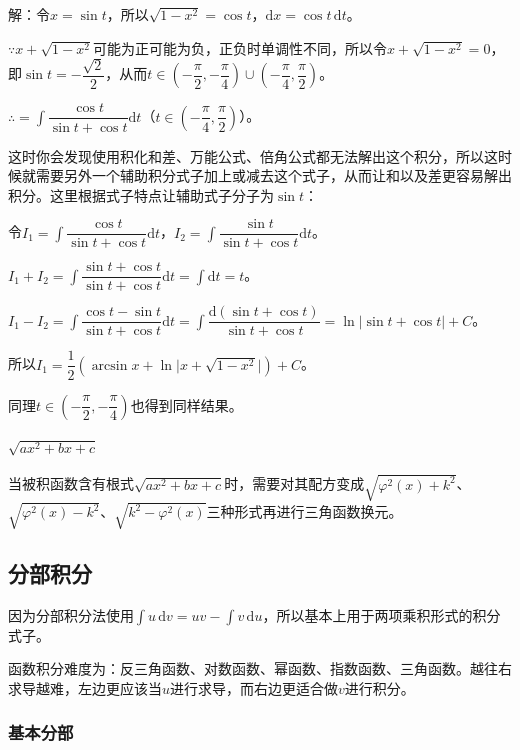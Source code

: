\documentclass[UTF8, 12pt]{ctexart}
\begin{document}
解：令$x=\sin t$，所以$\sqrt{1-x^2}=\cos t$，$\textrm{d}x=\cos t\,\textrm{d}t$。

$\because x+\sqrt{1-x^2}$可能为正可能为负，正负时单调性不同，所以令$ x+\sqrt{1-x^2}=0$，即$\sin t=-\dfrac{\sqrt{2}}{2}$，从而$t\in(-\dfrac{\pi}{2},-\dfrac{\pi}{4})\cup(-\dfrac{\pi}{4},\dfrac{\pi}{2})$。

$\therefore=\displaystyle{\int\dfrac{\cos t}{\sin t+\cos t}\textrm{d}t}$（$t\in(-\dfrac{\pi}{4},\dfrac{\pi}{2})$）。 \medskip

这时你会发现使用积化和差、万能公式、倍角公式都无法解出这个积分，所以这时候就需要另外一个辅助积分式子加上或减去这个式子，从而让和以及差更容易解出积分。这里根据式子特点让辅助式子分子为$\sin t$：

令$I_1=\displaystyle{\int\dfrac{\cos t}{\sin t+\cos t}\textrm{d}t}$，$I_2=\displaystyle{\int\dfrac{\sin t}{\sin t+\cos t}\textrm{d}t}$。

$I_1+I_2=\displaystyle{\int\dfrac{\sin t+\cos t}{\sin t+\cos t}\textrm{d}t=\int\textrm{d}t=t}$。

$I_1-I_2=\displaystyle{\int\dfrac{\cos t-\sin t}{\sin t+\cos t}\textrm{d}t=\int\dfrac{\textrm{d}(\sin t+\cos t)}{\sin t+\cos t}}=\ln\vert\sin t+\cos t\vert +C$。

所以$I_1=\dfrac{1}{2}(\arcsin x+\ln\vert x+\sqrt{1-x^2}\vert)+C$。

同理$t\in(-\dfrac{\pi}{2},-\dfrac{\pi}{4})$也得到同样结果。

\paragraph{\texorpdfstring{$\sqrt{ax^2+bx+c}$}\ } \leavevmode \medskip

当被积函数含有根式$\sqrt{ax^2+bx+c}$时，需要对其配方变成$\sqrt{\varphi^2(x)+k^2}$、$\sqrt{\varphi^2(x)-k^2}$、$\sqrt{k^2-\varphi^2(x)}$三种形式再进行三角函数换元。

\subsection{分部积分}

因为分部积分法使用$\int u\,\textrm{d}v=uv-\int v\,\textrm{d}u$，所以基本上用于两项乘积形式的积分式子。

函数积分难度为：反三角函数、对数函数、幂函数、指数函数、三角函数。越往右求导越难，左边更应该当$u$进行求导，而右边更适合做$v$进行积分。

\subsubsection{基本分部}
\end{document}
